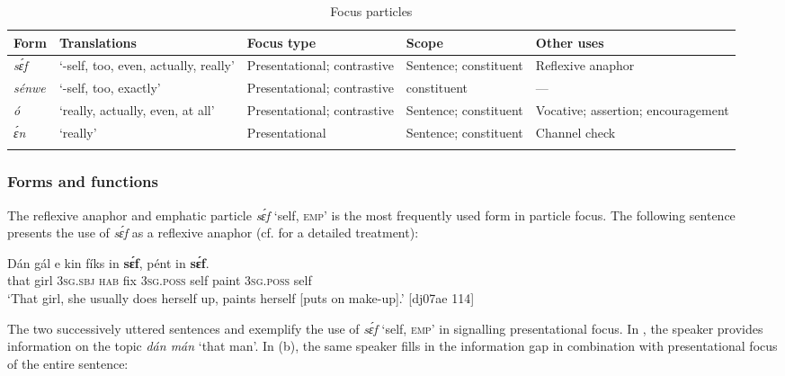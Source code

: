 \begin{table}
\caption{Focus particles}
\label{tab:key:7.5}

\begin{tabularx}{\textwidth}{lQQQQ}
\lsptoprule
Form & Translations & Focus type & Scope & Other uses\\
\midrule
\itshape sɛ́f & ‘-self, too, even, actually, really’ & Presentational; contrastive & Sentence; constituent & Reflexive anaphor\\
\tablevspace
\itshape sénwe & ‘-self, too, exactly’ & Presentational; contrastive & constituent & —\\
\tablevspace
\itshape ó & ‘really, actually, even, at all’ & Presentational; contrastive & Sentence; constituent & Vocative; assertion; encouragement\\
\tablevspace
\itshape ɛ́n & ‘really’ & Presentational & Sentence; constituent & Channel check\\
\lspbottomrule
\end{tabularx}
\end{table}
\subsubsection{Forms and functions}

The reflexive anaphor and emphatic particle \textit{sɛ́f} ‘self, \textsc{emp}’ is the most frequently used form in particle focus. The following sentence presents the use of \textit{sɛ́f} as a reflexive{\fff} anaphor (cf.  for a detailed treatment): {\fff}


\ea%
    \label{ex:key:662}
    \gll Dán    gál  e    kin  fíks  in      \textbf{sɛ́f},
pént    in    \textbf{sɛ́f}.\\
that    girl  \textsc{3sg.sbj}  \textsc{hab}  fix  \textsc{3sg.poss}    self
paint  \textsc{3sg.poss}  self\\

\glt 
`That girl, she usually does herself up, paints herself [puts on make-up].’ [dj07ae 114]
\z

The two successively uttered sentences  and  exemplify the use of \textit{sɛ́f} ‘self, \textsc{emp}’ in signalling presentational focus{\fff}. In , the speaker provides information on the topic \textit{dán mán} ‘that man’. In (b), the same speaker fills in the information gap in combination with presentational focus of the entire sentence: 



